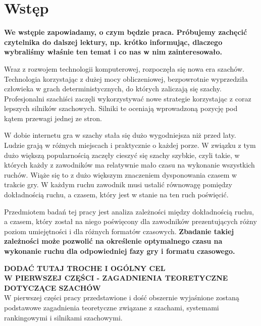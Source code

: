 \documentclass[inzynierska]{pwr_wmat_praca_dyplomowa}
\theoremstyle{plain}
\numberwithin{theorem}{chapter}
\theoremstyle{definition}
\numberwithin{theorem}{chapter}
\begin{document}

\frontmatter
\maketitle
\mainmatter
\tableofcontents

{\backmatter \chapter{Wstęp}}
\textbf{We wstępie zapowiadamy, o czym będzie praca. Próbujemy zachęcić czytelnika do dalszej lektury, np. krótko informując, dlaczego wybraliśmy właśnie ten temat i co nas w nim zainteresowało.}

Wraz z rozwojem technologii komputerowej, rozpoczęła się nowa era szachów. Technologia korzystając z dużej mocy obliczeniowej, bezpowrotnie wyprzedziła człowieka w grach deterministycznych, do których zaliczają się szachy. Profesjonalni szachiści zaczęli wykorzystywać nowe strategie korzystając z coraz lepszych silników szachowych. Silniki te oceniają wprowadzoną pozycję pod kątem przewagi jednej ze stron. 

W dobie internetu gra w szachy stała się dużo wygodniejsza niż przed laty. Ludzie grają w różnych miejscach i praktycznie o każdej porze. W związku z tym dużo większą popularnością zaczęły cieszyć się szachy szybkie, czyli takie, w których każdy z zawodników ma relatywnie mało czasu na wykonanie wszystkich ruchów. Wiąże się to z dużo większym znaczeniem dysponowania czasem w trakcie gry. W każdym ruchu zawodnik musi ustalić równowagę pomiędzy dokładnością ruchu, a czasem, który jest w stanie na ten ruch poświęcić. 

Przedmiotem badań tej pracy jest analiza zależności między dokładnością ruchu, a czasem, który został na niego poświęcony dla zawodników prezentujących różny poziom umiejętności i dla różnych formatów czasowych.\textbf{ Zbadanie takiej zależności może pozwolić na określenie optymalnego czasu na wykonanie ruchu dla odpowiedniej fazy gry i formatu czasowego.}

\textbf{DODAĆ TUTAJ TROCHE I OGÓLNY CEL}\\


\textbf{W PIERWSZEJ CZĘŚCI - ZAGADNIENIA TEORETYCZNE DOTYCZĄCE SZACHÓW}\\
W pierwszej części pracy przedstawione i dość obszernie wyjaśnione zostaną podstawowe zagadnienia teoretyczne związane z szachami, systemami rankingowymi i silnikami szachowymi.
\end{document}
